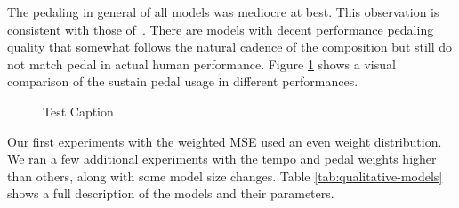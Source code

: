 The pedaling in general of all models was mediocre at best. This observation is consistent with those of~\citet{jeong2019virtuosonet}. There are models with decent performance pedaling quality that somewhat follows the natural cadence of the composition but still do not match pedal in actual human performance. Figure \ref{fig:pedal-difference} shows a visual comparison of the sustain pedal usage in different performances. 

\begin{figure}
    \centering
    \caption{Test Caption}
    \label{fig:pedal-difference}
\end{figure}

Our first experiments with the weighted MSE used an even weight distribution. We ran a few additional experiments with the tempo and pedal weights higher than others, along with some model size changes. Table \ref{tab:qualitative-models} shows a full description of the models and their parameters.

\newcommand{\am}{$AM$}

